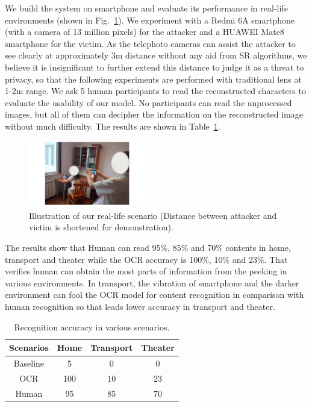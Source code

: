 We build the system on smartphone and evaluate its performance in real-life environments (shown in Fig.~\ref{fig-reallife}). We experiment with a Redmi 6A smartphone (with a camera of 13 million pixels) for the attacker and a HUAWEI Mate8 smartphone for the victim. As the telephoto cameras can assist the attacker to see clearly at approximately 3m distance without any aid from SR algorithms, we believe it is insignificant to further extend this distance to judge it as a threat to privacy, so that the following experiments are performed with traditional lens at 1-2m range. We ask 5 human participants to read the reconstructed characters to evaluate the usability of our model. No participants can read the unprocessed images, but all of them can decipher the information on the reconstructed image without much difficulty. The results are shown in Table~\ref{table-scenarios}.
\begin{figure}
	\centering
	\includegraphics[width=0.46\textwidth]{pic/reallife.pdf}
    \caption{Illustration of our real-life scenario (Distance between attacker and victim is shortened for demonstration).}
	\label{fig-reallife}
\end{figure}

The results show that Human can read 95\%, 85\% and 70\% contents in home, transport and theater while the OCR accuracy is 100\%, 10\% and 23\%. That verifies human can obtain the most parts of information from the peeking in various environments. In transport, the vibration of smartphone and the darker environment can fool the OCR model for content recognition in comparison with human recognition so that leads lower accuracy in transport and theater.

\begin{table}[!t]
    \centering
    \caption{Recognition accuracy in various scenarios.}
    \begin{tabular}{@{}cccc@{}}
        \toprule
    Scenarios & Home & Transport & Theater \\ \midrule
    Baseline & 5 & 0 & 0\\ 
    \midrule
    OCR & 100 & 10 & 23\\ 
    Human & 95 & 85 & 70\\ \bottomrule
    \end{tabular}
    \label{table-scenarios}
\end{table}

